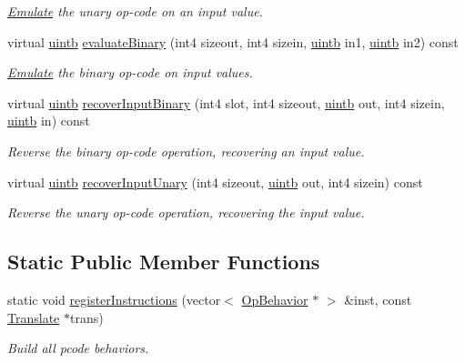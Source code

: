 \begin{DoxyCompactItemize}
\begin{DoxyCompactList}\small\item\em \mbox{\hyperlink{class_emulate}{Emulate}} the unary op-\/code on an input value. \end{DoxyCompactList}\item 
virtual \mbox{\hyperlink{types_8h_a2db313c5d32a12b01d26ac9b3bca178f}{uintb}} \mbox{\hyperlink{class_op_behavior_aeeed3af7aa35264b31a1f182884214a9}{evaluate\+Binary}} (int4 sizeout, int4 sizein, \mbox{\hyperlink{types_8h_a2db313c5d32a12b01d26ac9b3bca178f}{uintb}} in1, \mbox{\hyperlink{types_8h_a2db313c5d32a12b01d26ac9b3bca178f}{uintb}} in2) const
\begin{DoxyCompactList}\small\item\em \mbox{\hyperlink{class_emulate}{Emulate}} the binary op-\/code on input values. \end{DoxyCompactList}\item 
virtual \mbox{\hyperlink{types_8h_a2db313c5d32a12b01d26ac9b3bca178f}{uintb}} \mbox{\hyperlink{class_op_behavior_adebec9b6516f4efa5c65323abd3619c3}{recover\+Input\+Binary}} (int4 slot, int4 sizeout, \mbox{\hyperlink{types_8h_a2db313c5d32a12b01d26ac9b3bca178f}{uintb}} out, int4 sizein, \mbox{\hyperlink{types_8h_a2db313c5d32a12b01d26ac9b3bca178f}{uintb}} in) const
\begin{DoxyCompactList}\small\item\em Reverse the binary op-\/code operation, recovering an input value. \end{DoxyCompactList}\item 
virtual \mbox{\hyperlink{types_8h_a2db313c5d32a12b01d26ac9b3bca178f}{uintb}} \mbox{\hyperlink{class_op_behavior_a6c3b008e093085e50f71020437be3b03}{recover\+Input\+Unary}} (int4 sizeout, \mbox{\hyperlink{types_8h_a2db313c5d32a12b01d26ac9b3bca178f}{uintb}} out, int4 sizein) const
\begin{DoxyCompactList}\small\item\em Reverse the unary op-\/code operation, recovering the input value. \end{DoxyCompactList}\end{DoxyCompactItemize}
\subsection*{Static Public Member Functions}
\begin{DoxyCompactItemize}
\item 
static void \mbox{\hyperlink{class_op_behavior_a652a4c9fa1b57d594e1c48d296d6b4e0}{register\+Instructions}} (vector$<$ \mbox{\hyperlink{class_op_behavior}{Op\+Behavior}} $\ast$ $>$ \&inst, const \mbox{\hyperlink{class_translate}{Translate}} $\ast$trans)
\begin{DoxyCompactList}\small\item\em Build all pcode behaviors. \end{DoxyCompactList}\end{DoxyCompactItemize}


